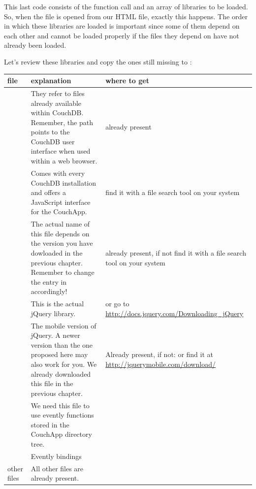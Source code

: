 \documentclass[letterpaper,10pt,english]{sphinxmanual}
\begin{document}
This last code consists of the function call  and an array of libraries to be loaded. So, when the file  is opened from our HTML file, exactly this happens. The order in which these libraries are loaded is important since some of them depend on each other and cannot be loaded properly if the files they depend on have not already been loaded.

Let's review these libraries and copy the ones still missing to :

\begin{tabulary}{\linewidth}{|L|L|L|}
\hline
\textbf{
file
} & \textbf{
explanation
} & \textbf{
where to get
}\\
\hline

 & 
They refer to files already available within CouchDB. Remember,
the path  points to the CouchDB user interface when
used within a web browser.
 & 
already present
\\

 & 
Comes with every CouchDB installation and offers a JavaScript
interface for the CouchApp.
 & 
find it with a file search tool on your system
\\

 & 
The actual name of this file depends on the version you have
dowloaded in the previous chapter. Remember to change the entry
in  accordingly!
 & 
already present, if not find it with a file
search tool on your system
\\

 & 
This is the actual jQuery library.
 & 
or go to
\href{http://docs.jquery.com/Downloading\_jQuery}{http://docs.jquery.com/Downloading\_jQuery}
\\

 & 
The mobile version of jQuery. A newer version than the one
proposed here may also work for you. We already downloaded this
file in the previous chapter.
 & 
Already present, if not:  or find it at
\href{http://jquerymobile.com/download/}{http://jquerymobile.com/download/}
\\

 & 
We need this file to use evently functions stored in the CouchApp
directory tree.
 & 
\\

 & 
Evently bindings
 & 
\\

other files
 & 
All other files are already present.
 & \\
\hline
\end{tabulary}
\end{document}
